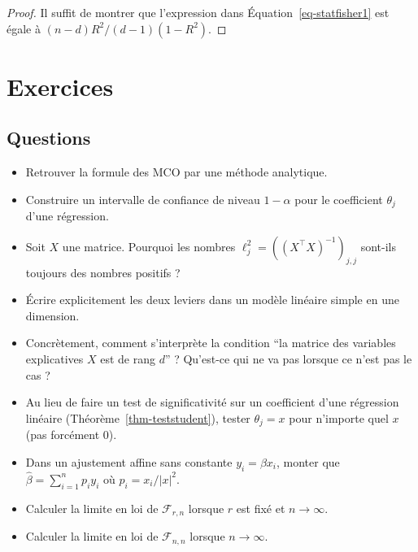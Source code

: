 \documentclass[
  10,
  letterpaper,
  DIV=11,
  numbers=noendperiod]{scrreport}
\providecommand{\tightlist}{%
  \setlength{\itemsep}{0pt}\setlength{\parskip}{0pt}}\usepackage{longtable,booktabs,array}
\theoremstyle{plain}
\theoremstyle{definition}
\theoremstyle{plain}
\theoremstyle{definition}
\theoremstyle{definition}
\theoremstyle{plain}
\theoremstyle{remark}
\begin{document}
\begin{proof}

Il suffit de montrer que l'expression dans Équation~\ref{eq-statfisher1}
est égale à \((n-d)R^2/(d-1)(1-R^2)\).

\end{proof}


\hypertarget{exercices-6}{%
\chapter*{Exercices}\label{exercices-6}}


\hypertarget{questions-3}{%
\section*{Questions}\label{questions-3}}


\begin{itemize}
\tightlist
\item
  Retrouver la formule des MCO par une méthode analytique.
\item
  Construire un intervalle de confiance de niveau \(1-\alpha\) pour le
  coefficient \(\theta_j\) d'une régression.
\item
  Soit \(X\) une matrice. Pourquoi les nombres
  \(\ell^2_j = ((X^\top X)^{-1})_{j,j}\) sont-ils toujours des nombres
  positifs ?
\item
  Écrire explicitement les deux leviers dans un modèle linéaire simple
  en une dimension.
\item
  Concrètement, comment s'interprète la condition ``la matrice des
  variables explicatives \(X\) est de rang \(d\)'' ? Qu'est-ce qui ne va
  pas lorsque ce n'est pas le cas ?
\item
  Au lieu de faire un test de significativité sur un coefficient d'une
  régression linéaire (Théorème~\ref{thm-teststudent}), tester
  \(\theta_j=x\) pour n'importe quel \(x\) (pas forcément \(0\)).
\item
  Dans un ajustement affine sans constante \(y_i=\beta x_i\), monter que
  \(\hat{\beta} = \sum_{i=1}^n p_i y_i\) où \(p_i = x_i/|x|^2\).
\item
  Calculer la limite en loi de \(\mathscr{F}_{r,n}\) lorsque \(r\) est
  fixé et \(n \to \infty\).
\item
  Calculer la limite en loi de \(\mathscr{F}_{n,n}\) lorsque
  \(n \to \infty\).
\end{itemize}
\end{document}
